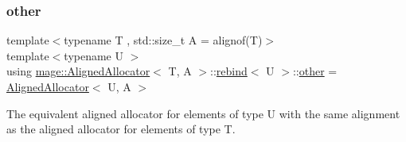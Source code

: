 \subsubsection{\texorpdfstring{other}{other}}
{\footnotesize\ttfamily template$<$typename T , std\+::size\+\_\+t A = alignof(\+T)$>$ \\
template$<$typename U $>$ \\
using \mbox{\hyperlink{classmage_1_1_aligned_allocator}{mage\+::\+Aligned\+Allocator}}$<$ T, A $>$\+::\mbox{\hyperlink{structmage_1_1_aligned_allocator_1_1rebind}{rebind}}$<$ U $>$\+::\mbox{\hyperlink{structmage_1_1_aligned_allocator_1_1rebind_a12f5ac277f4ef4993d1f73eba91c3439}{other}} =  \mbox{\hyperlink{classmage_1_1_aligned_allocator}{Aligned\+Allocator}}$<$ U, A $>$}

The equivalent aligned allocator for elements of type {\ttfamily U} with the same alignment as the aligned allocator for elements of type {\ttfamily T}. 